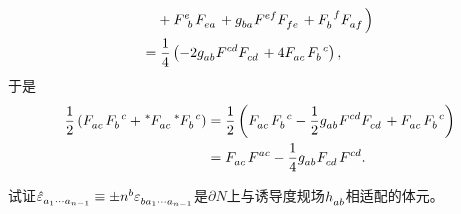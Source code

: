 \begin{xiti}
\begin{zm}
\begin{align*}
		& + \tensor{F}{^e_b} \tensor{F}{_e_a} + \tensor{g}{_b_a} \tensor{F}{^e^f} \tensor{F}{_f_e} + \tensor{F}{_b^f} \tensor{F}{_a_f} \Big)\\
		=& \mspace{5mu} \frac{1}{4} \left( -2\tensor{g}{_a_b} \tensor{F}{^c^d} \tensor{F}{_c_d} + 4 \tensor{F}{_a_c} \tensor{F}{_b^c}  \right),
		\end{align*}
		于是
		\begin{align*}
		\frac{1}{2} \left( \tensor{F}{_a_c}\tensor{F}{_b^c} + \tensor[^*]{F}{_a_c} \tensor[^*]{F}{_b^c} \right)&= \frac{1}{2} \left( \tensor{F}{_a_c} \tensor{F}{_b^c} - \frac{1}{2} \tensor{g}{_a_b} \tensor{F}{^c^d} \tensor{F}{_c_d} + \tensor{F}{_a_c} \tensor{F}{_b^c} \right)\\
		&= \tensor{F}{_a_c} \tensor{F}{^a^c} - \frac{1}{4} \tensor{g}{_a_b} \tensor{F}{_c_d} \tensor{F}{^c^d}.
		\end{align*}
	\end{zm}
	
	\item 试证$\tensor{\hat{\varepsilon}}{_{a_1\cdots a_{n-1}}} \equiv \pm \tensor{n}{^b} \tensor{\varepsilon}{_{b a_1 \cdots a_{n-1}}} $是$\partial N $上与诱导度规场$\tensor{h}{_a_b} $相适配的体元。
	

\end{xiti}
